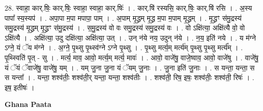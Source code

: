 \documentclass[17pt]{extarticle}
\begin{document}
28. स्वाहा॒ कार्.षिः॒ कार्.षिः॒ स्वाहा॒ स्वाहा॒ कार्.षिः॑ । . कार्.षि॑ रस्यसि॒ कार्.षिः॒ कार्.षि॑ रसि । . अ॒स्य पापा᳚ स्य॒स्यप॑ । . अपा॒पा म॒पा मपापा॒ पाम् । . अ॒पाम् मृ॒द्ध्रम् मृ॒द्ध्र म॒पा म॒पाम् मृ॒द्ध्रम् । . मृ॒द्ध्रꣳ स॑मु॒द्रस्य॑ समु॒द्रस्य॑ मृ॒द्ध्रम् मृ॒द्ध्रꣳ स॑मु॒द्रस्य॑ । . स॒मु॒द्रस्य॑ वो वः समु॒द्रस्य॑ समु॒द्रस्य॑ वः । . वो ऽक्षि॑त्या॒ अक्षि॑त्यै वो॒ वो ऽक्षि॑त्यै । . अक्षि॑त्या॒ उदु दक्षि॑त्या॒ अक्षि॑त्या॒ उत् । . उन् न॑ये नय॒ उदुन् न॑ये । . न॒य॒ इति॑ नये । . य म॑ग्ने ऽग्ने॒ यं ॅय म॑ग्ने । . अ॒ग्ने॒ पृ॒थ्सु पृ॒थ्स्व॑ग्ने ऽग्ने पृ॒थ्सु । . पृ॒थ्सु मर्त्य॒म् मर्त्य॑म् पृ॒थ्सु पृ॒थ्सु मर्त्य᳚म् । . पृ॒थ्स्विति॑ पृ॒त् - सु । . मर्त्य॒ माव॒ आवो॒ मर्त्य॒म् मर्त्य॒ मावः॑ । . आवो॒ वाजे॑षु॒ वाजे॒ष्वाव॒ आवो॒ वाजे॑षु । . वाजे॑षु॒ यं ॅयं ॅवाजे॑षु॒ वाजे॑षु॒ यम् । . यम् जु॒ना जु॒ना यं ॅयम् जु॒नाः । . जु॒ना इति॑ जु॒नाः । . स यन्ता॒ यन्ता॒ स स यन्ता᳚ । . यन्ता॒ शश्व॑तीः॒ शश्व॑ती॒र् यन्ता॒ यन्ता॒ शश्व॑तीः । . शश्व॑ती॒ रिष॒ इषः॒ शश्व॑तीः॒ शश्व॑ती॒ रिषः॑ । . इष॒ इतीषः॑ । \newline

\textbf{Ghana Paata } \newline
\end{document}
